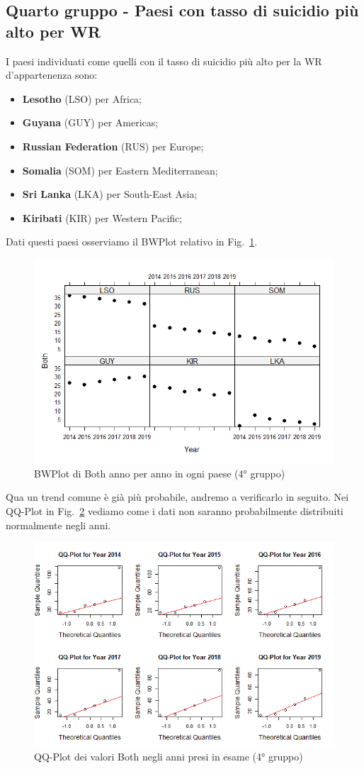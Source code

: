 \documentclass[conference]{IEEEtran}
\begin{document}
\subsection{Quarto gruppo - Paesi con tasso di suicidio più alto per WR}

I paesi individuati come quelli con il tasso di suicidio più alto per la
WR d'appartenenza sono:
\begin{itemize}
    \item \textbf{Lesotho} (LSO) per Africa;
    \item \textbf{Guyana} (GUY) per Americas;
    \item \textbf{Russian Federation} (RUS) per Europe;
    \item \textbf{Somalia} (SOM) per Eastern Mediterranean;
    \item \textbf{Sri Lanka} (LKA) per South-East Asia;
    \item \textbf{Kiribati} (KIR) per Western Pacific; 
\end{itemize}
Dati questi paesi osserviamo il BWPlot relativo in Fig.~\ref{11fourthgroup}.
\begin{figure}[htbp]
    \centerline{\includegraphics[width=.5\textwidth]{img/11 - Fourthgroup.png}}
    \caption{BWPlot di Both anno per anno in ogni paese (4° gruppo)}
    \label{11fourthgroup}
\end{figure}
Qua un trend comune è già più probabile, andremo a verificarlo in seguito.
Nei QQ-Plot in Fig.~\ref{12fourthqq} vediamo come i dati non saranno
probabilmente distribuiti normalmente negli anni.
\begin{figure}[htbp]
    \centerline{\includegraphics[width=.5\textwidth]{img/12 - Fourthqq.png}}
    \caption{QQ-Plot dei valori Both negli anni presi in esame (4° gruppo)}
    \label{12fourthqq}
\end{figure}
\end{document}
